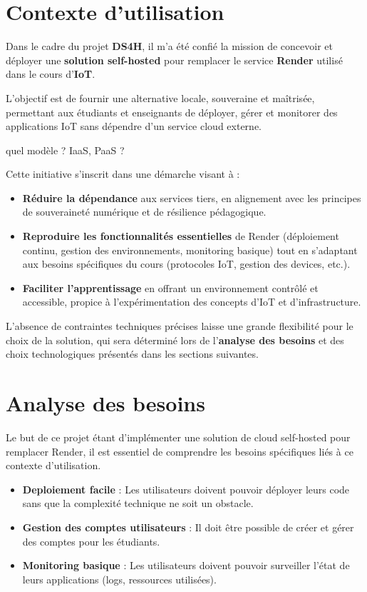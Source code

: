 \documentclass{report} %
\begin{document}
\section{Contexte d'utilisation} %
Dans le cadre du projet \textbf{DS4H}, il m'a été confié la mission de
concevoir et déployer une \textbf{solution self-hosted} pour remplacer
le service \textbf{Render} utilisé dans le cours d’\textbf{IoT}.

L’objectif est de fournir une alternative locale, souveraine et
maîtrisée, permettant aux étudiants et enseignants de déployer, gérer
et monitorer des applications IoT sans dépendre d’un service cloud
externe.

{\color{red} quel modèle ? IaaS, PaaS ?}


Cette initiative s’inscrit dans une démarche visant à :
\begin{itemize}
\item \textbf{Réduire la dépendance} aux services tiers, en alignement
  avec les principes de souveraineté numérique et de résilience
  pédagogique.
\item \textbf{Reproduire les fonctionnalités essentielles} de Render
  (déploiement continu, gestion des environnements, monitoring
  basique) tout en s’adaptant aux besoins spécifiques du cours
  (protocoles IoT, gestion des devices, etc.).
\item \textbf{Faciliter l’apprentissage} en offrant un environnement
  contrôlé et accessible, propice à l’expérimentation des concepts
  d’IoT et d’infrastructure.
\end{itemize}


L’absence de contraintes techniques précises laisse une grande
flexibilité pour le choix de la solution, qui sera déterminé lors de
l’\textbf{analyse des besoins} et des choix technologiques présentés
dans les sections suivantes.


\section{Analyse des besoins}
Le but de ce projet étant d'implémenter une solution de cloud
self-hosted pour remplacer Render, il est essentiel de comprendre les
besoins spécifiques liés à ce contexte d’utilisation.
\begin{itemize}
    \item \textbf{Deploiement facile} : Les utilisateurs doivent pouvoir déployer leurs code sans que la complexité technique ne soit un obstacle.
    \item \textbf{Gestion des comptes utilisateurs} : Il doit être possible de créer et gérer des comptes pour les étudiants.
    \item \textbf{Monitoring basique} : Les utilisateurs doivent pouvoir surveiller l’état de leurs applications (logs, ressources utilisées).
\end{itemize}
\end{document}
